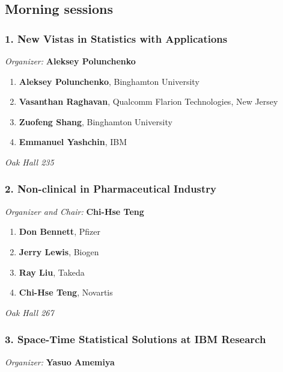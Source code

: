 
\subsection*{Morning sessions}

\subsubsection*{1. New Vistas in Statistics with Applications}

\emph{Organizer:} \textbf{Aleksey Polunchenko}

\begin{enumerate}
\item \textbf{Aleksey Polunchenko}, Binghamton University 
\item \textbf{Vasanthan Raghavan}, Qualcomm Flarion Technologies, New Jersey 
\item \textbf{Zuofeng Shang}, Binghamton University 
\item \textbf{Emmanuel Yashchin}, IBM 
\end{enumerate}

\emph{Oak Hall 235} \\[.5em]

\subsubsection*{2. Non-clinical in Pharmaceutical Industry}

\emph{Organizer and Chair:} \textbf{Chi-Hse Teng}

\begin{enumerate}
\item \textbf{Don Bennett}, Pfizer 
\item \textbf{Jerry Lewis}, Biogen 
\item \textbf{Ray Liu}, Takeda 
\item \textbf{Chi-Hse Teng}, Novartis 
\end{enumerate}

\emph{Oak Hall 267} \\[.5em]

\subsubsection*{3. Space-Time Statistical Solutions at IBM Research}

\emph{Organizer:} \textbf{Yasuo Amemiya}

